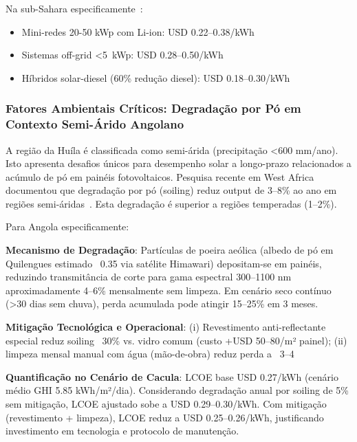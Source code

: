 \documentclass[12pt, a4paper]{article}
\begin{document}
Na sub-Sahara especificamente~\citep{IRENA2022}:
\begin{itemize}
\item Mini-redes 20-50 kWp com Li-ion: USD 0.22--0.38/kWh
\item Sistemas off-grid <5~kWp: USD 0.28--0.50/kWh
\item Híbridos solar-diesel (60\% redução diesel): USD 0.18--0.30/kWh
\end{itemize}

\subsubsection{Fatores Ambientais Críticos: Degradação por Pó em Contexto Semi-Árido Angolano}

A região da Huíla é classificada como semi-árida (precipitação <600 mm/ano).
Isto apresenta desafios únicos para desempenho solar a longo-prazo relacionados a acúmulo de pó em painéis fotovoltaicos.
Pesquisa recente em West Africa documentou que degradação por pó (soiling) reduz output de 3--8\% ao ano em regiões semi-áridas~\citep{Isaacs2025}.
Esta degradação é superior a regiões temperadas (1--2\%).

Para Angola especificamente:

\textbf{Mecanismo de Degradação}: Partículas de poeira aeólica (albedo de pó em Quilengues estimado ~0.35 via satélite Himawari) depositam-se em painéis, reduzindo transmitância de corte para gama espectral 300--1100 nm aproximadamente 4--6\% mensalmente sem limpeza. Em cenário seco contínuo (>30 dias sem chuva), perda acumulada pode atingir 15--25\% em 3 meses.

\textbf{Mitigação Tecnológica e Operacional}: (i) Revestimento anti-reflectante especial reduz soiling ~30\% vs. vidro comum (custo +USD 50--80/m² painel); (ii) limpeza mensal manual com água (mão-de-obra) reduz perda a ~3--4%

\textbf{Quantificação no Cenário de Cacula}: LCOE base USD 0.27/kWh (cenário médio GHI 5.85 kWh/m²/dia). Considerando degradação anual por soiling de 5\% sem mitigação, LCOE ajustado sobe a USD 0.29--0.30/kWh. Com mitigação (revestimento + limpeza), LCOE reduz a USD 0.25--0.26/kWh, justificando investimento em tecnologia e protocolo de manutenção.
\end{document}
